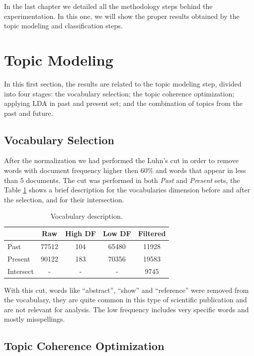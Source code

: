 In the last chapter we detailed all the methodology steps behind the experimentation. In this one, we will show the proper results obtained by the topic modeling and classification steps.

\section{Topic Modeling}

In this first section, the results are related to the topic modeling step, divided into four stages: the vocabulary selection; the topic coherence optimization; applying LDA in past and present set; and the combination of topics from the past and future.

\subsection{Vocabulary Selection}

After the normalization we had performed the Luhn's cut in order to remove words with document frequency higher then 60\% and words that appear in less than 5 documents. The cut was performed in both \textit{Past} and \textit{Present} sets, the Table \ref{tab:vocabulary} shows a brief description for the vocabularies dimension before and after the selection, and for their intersection.

\begin{table}[h!]
	\centering
	\caption{Vocabulary description.}
	\label{tab:vocabulary}
	\begin{tabular}{l|cccc}
		\toprule
		          &  \textbf{Raw}  & \textbf{High DF} & \textbf{Low DF} & \textbf{Filtered} \\ \midrule
		Past      & 77512 &   104   & 65480  &  11928   \\
		Present   & 90122 &   183   & 70356  &  19583   \\
		Intersect &   -   &    -    &   -    &   9745   \\ \bottomrule
	\end{tabular}
\end{table}

With this cut, words like ``abstract'', ``show'' and ``reference'' were removed from the vocabulary, they are quite common in this type of scientific publication and are not relevant for analysis. The low frequency includes very specific words and mostly misspellings.

\subsection{Topic Coherence Optimization}

